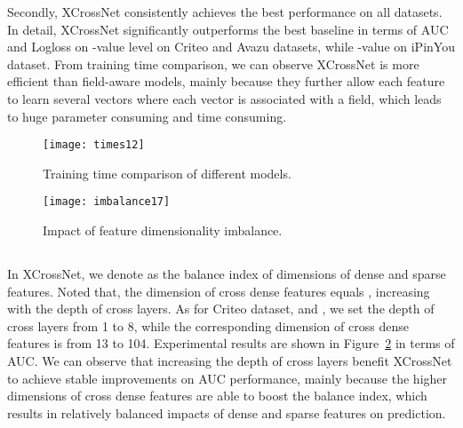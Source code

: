 \documentclass[letterpaper]{article} \usepackage{aaai21}  \usepackage{times}  \usepackage{helvet} \usepackage{courier}  \usepackage[hyphens]{url}  \usepackage{graphicx} \urlstyle{rm} \def\UrlFont{\rm}  \usepackage{natbib}  \usepackage{caption} \frenchspacing  \setlength{\pdfpagewidth}{8.5in}  \setlength{\pdfpageheight}{11in}  \usepackage{graphicx}
\begin{document}
Secondly, XCrossNet consistently achieves the best performance on all datasets. In detail, XCrossNet significantly outperforms the best baseline in terms of AUC and Logloss on -value  level on Criteo and Avazu datasets, while -value  on iPinYou dataset. From training time comparison, we can observe XCrossNet is more efficient than field-aware models, mainly because they further allow each feature to learn several vectors where each vector is associated with a field, which leads to huge parameter consuming and time consuming.


\begin{figure}[!t]
	\centering
	\texttt{[image: times12]} \vspace{-0.6cm}
	\caption{Training time comparison of different models.}
	\label{fig3}
	\vspace{-0.2cm}
\end{figure}

\begin{figure}[!t]
	\centering
	\texttt{[image: imbalance17]} \vspace{-0.3cm}
	\caption{Impact of feature dimensionality imbalance.}
	\label{fig4}
	\vspace{-0.5cm}
\end{figure}


\vspace{-0.1cm}
\subsection{\fontsize{10.4pt}{13pt} \selectfont{Feature Dimensionality Imbalance Study (RQ2)}}
\vspace{-0.1cm}
In XCrossNet, we denote  as the balance index of dimensions of dense and sparse features.
Noted that, the dimension of cross dense features  equals , increasing with the depth of cross layers. As for Criteo dataset,  and , we set the depth of cross layers from 1 to 8, while the corresponding dimension of cross dense features is from 13 to 104. Experimental results are shown in Figure~\ref{fig4} in terms of AUC. We can observe that increasing the depth of cross layers benefit XCrossNet to achieve stable improvements on AUC performance, mainly because the higher dimensions of cross dense features are able to boost the balance index, which results in relatively balanced impacts of dense and sparse features on prediction.
\end{document}
